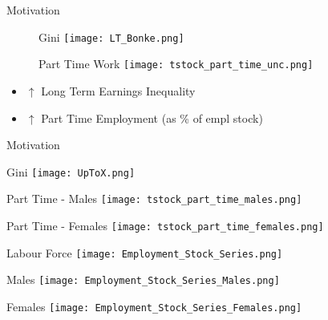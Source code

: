 \documentclass{beamer}
\let\oldcite=\cite
\renewcommand{\cite}[1]{\textcolor[rgb]{.0,.2,.7}{\oldcite{#1}}}
\begin{document}
\begin{frame}{Motivation}\label{LTEI_App}
\begin{figure}[!t]
\centering
\begin{minipage}[b]{0.48\textwidth}{Gini}
\centering
\texttt{[image: LT\_Bonke.png]}
\end{minipage}
\begin{minipage}[b]{0.48\textwidth}{Part Time Work}
\centering
\texttt{[image: tstock\_part\_time\_unc.png]}
\end{minipage}
\end{figure}
\begin{itemize}
\setlength{\itemsep}{0.7 cm}
\item $\uparrow$ Long Term Earnings Inequality \cite{BoCo15}
\item $\uparrow$ Part Time Employment (as \% of empl stock)
\end{itemize}
\hyperlink{Motivation_1}{}
\end{frame}

\begin{frame}{Motivation}\label{LF}
\begin{minipage}[b]{0.32\textwidth}{Gini}
\centering
\texttt{[image: UpToX.png]}
\end{minipage}
\begin{minipage}[b]{0.32\textwidth}{Part Time - Males}
\centering
\texttt{[image: tstock\_part\_time\_males.png]}
\end{minipage}
\begin{minipage}[b]{0.32\textwidth}{Part Time - Females}
\centering
\texttt{[image: tstock\_part\_time\_females.png]}
\end{minipage}
\begin{minipage}[b]{0.32\textwidth}{Labour Force}
\centering
\texttt{[image: Employment\_Stock\_Series.png]}
\end{minipage}
\begin{minipage}[b]{0.32\textwidth}{Males}
\centering
\texttt{[image: Employment\_Stock\_Series\_Males.png]}
\end{minipage}
\begin{minipage}[b]{0.32\textwidth}{Females}
\centering
\texttt{[image: Employment\_Stock\_Series\_Females.png]}
\end{minipage}
\hyperlink{Motivation_1}{}
\hyperlink{Assumption}{}
\hyperlink{WF}{}
\end{frame}
\end{document}

